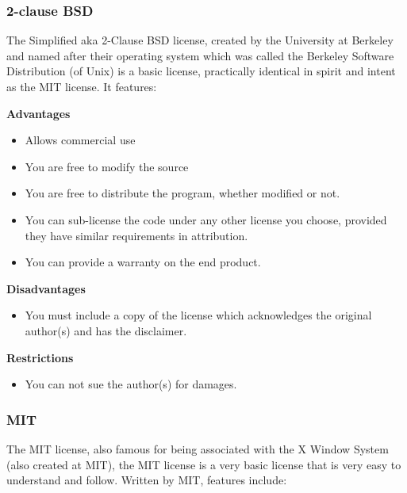 \subsubsection{2-clause BSD}
The Simplified aka 2-Clause BSD license, created by the University at Berkeley and named after their operating system which was called the Berkeley Software Distribution (of Unix) is a basic license, practically identical in spirit and intent as the MIT license. It features:

\textbf{Advantages}
\begin{itemize}
\item Allows commercial use
\item You are free to modify the source
\item You are free to distribute the program, whether modified or not.
\item You can sub-license the code under any other license you choose, provided they have similar requirements in attribution.
\item You can provide a warranty on the end product.
\end{itemize}
\textbf{Disadvantages}
\begin{itemize}
\item You must include a copy of the license which acknowledges the original author(s) and has the disclaimer.
\end{itemize}
\textbf{Restrictions}
\begin{itemize}
\item You can not sue the author(s) for damages.
\end{itemize}

\subsubsection{MIT}
The MIT license, also famous for being associated with the X Window System (also created at MIT), the MIT license is a very basic license that is very easy to understand and follow. Written by MIT, features include:

